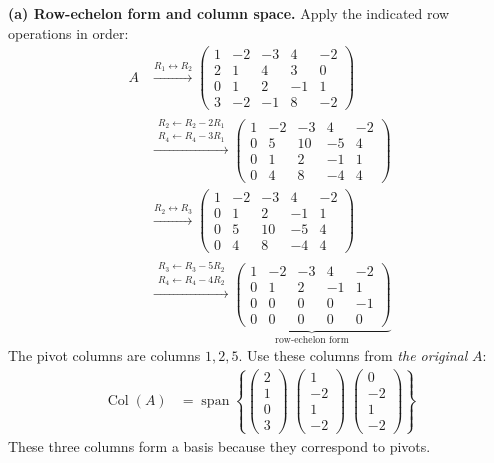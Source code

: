 \documentclass[11pt,a4paper]{article}
\newcommand{\R}{\mathbb{R}}
\newcommand{\Col}{\operatorname{Col}}
\begin{document}
\textbf{(a) Row-echelon form and column space.} Apply the indicated row operations in order:
\begin{align*}
A
&\xrightarrow{R_1\leftrightarrow R_2}
\begin{pmatrix}
1&-2&-3&4&-2\\
2&1&4&3&0\\
0&1&2&-1&1\\
3&-2&-1&8&-2
\end{pmatrix}\\
&\xrightarrow{\substack{R_2\leftarrow R_2-2R_1\\R_4\leftarrow R_4-3R_1}}
\begin{pmatrix}
1&-2&-3&4&-2\\
0&5&10&-5&4\\
0&1&2&-1&1\\
0&4&8&-4&4
\end{pmatrix}\\
&\xrightarrow{R_2\leftrightarrow R_3}
\begin{pmatrix}
1&-2&-3&4&-2\\
0&1&2&-1&1\\
0&5&10&-5&4\\
0&4&8&-4&4
\end{pmatrix}\\
&\xrightarrow{\substack{R_3\leftarrow R_3-5R_2\\R_4\leftarrow R_4-4R_2}}
\underbrace{\begin{pmatrix}
1&-2&-3&4&-2\\
0&1&2&-1&1\\
0&0&0&0&-1\\
0&0&0&0&0
\end{pmatrix}}_{\text{row-echelon form}}
\end{align*}
The pivot columns are columns $1,2,5$. Use these columns from \emph{the original} $A$:
\begin{align*}
\Col(A)
&=\operatorname{span}\left\{
\begin{pmatrix}2\\1\\0\\3\end{pmatrix}\;
\begin{pmatrix}1\\-2\\1\\-2\end{pmatrix}\;
\begin{pmatrix}0\\-2\\1\\-2\end{pmatrix}
\right\}
\end{align*}
These three columns form a basis because they correspond to pivots.
\end{document}
